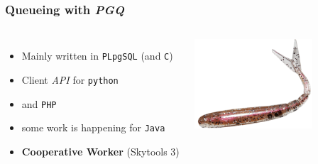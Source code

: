 \documentclass[english]{beamer}
\begin{document}
\begin{frame}[fragile]
  \frametitle{Queueing with \textit{PGQ}}

  \linebreak

\begin{columns}[c]

  \begin{itemize}
   \item<1-> Mainly written in \texttt{PLpgSQL} (and \texttt{C})
   \item<1-> Client \textit{API} for \texttt{python}
   \item<1-> and \texttt{PHP}
   \item<2-> some work is happening for \texttt{Java}
   \item<3-> \textbf{Cooperative Worker} (Skytools 3)
  \end{itemize}  


\includegraphics[height=9em]{drop-queue.png}
\end{columns}
\end{frame}
\end{document}
